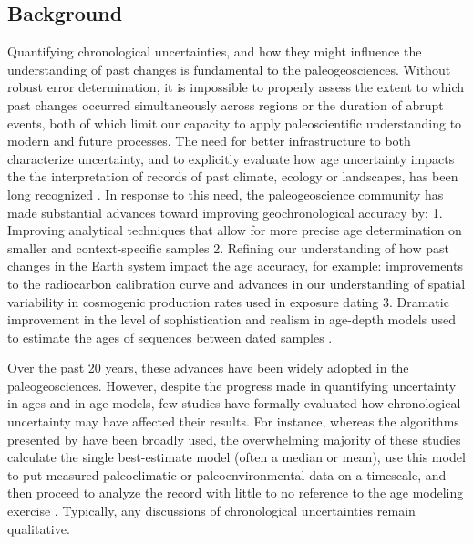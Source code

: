 \documentclass[gc, manuscript]{copernicus}
\begin{document}


\introduction

\subsection{Background}

Quantifying chronological uncertainties, and how they might influence
the understanding of past changes is fundamental to the
paleogeosciences. Without robust error determination, it is impossible
to properly assess the extent to which past changes occurred
simultaneously across regions or the duration of abrupt events, both of
which limit our capacity to apply paleoscientific understanding to
modern and future processes. The need for better infrastructure to both
characterize uncertainty, and to explicitly evaluate how age uncertainty
impacts the the interpretation of records of past climate, ecology or
landscapes, has been long recognized \citep[(more)]{Noren2013}. In
response to this need, the paleogeoscience community has made
substantial advances toward improving geochronological accuracy by: 1.
Improving analytical techniques that allow for more precise age
determination on smaller and context-specific samples
\citep[\citet{Eglinton96},\citet{Fifield2000},\citet{Eggins2005},\citet{Santos_blank_2010}]{Brown_radiocarbon89}
2. Refining our understanding of how past changes in the Earth system
impact the age accuracy, for example: improvements to the radiocarbon
calibration curve \citep[\citet{Stuiver98},intcal references]{Stuiver91}
and advances in our understanding of spatial variability in cosmogenic
production rates used in exposure dating \citep[Masarik2009]{Balco2009}
3. Dramatic improvement in the level of sophistication and realism in
age-depth models used to estimate the ages of sequences between dated
samples \citep[e.g.][\citet{parnell2008flexible},
\citet{Blaauw2010CLAM}, \citet{Blaauw2011BACON}]{Ramsey2009Bayesian}.

Over the past 20 years, these advances have been widely adopted in the
paleogeosciences. However, despite the progress made in quantifying
uncertainty in ages and in age models, few studies have formally
evaluated how chronological uncertainty may have affected their results.
For instance, whereas the algorithms presented by
\citep[\citet{parnell2008flexible}, \citet{Blaauw2010CLAM},
\citet{Blaauw2011BACON}]{Ramsey2009Bayesian} have been broadly used, the
overwhelming majority of these studies calculate the single
best-estimate model (often a median or mean), use this model to put
measured paleoclimatic or paleoenvironmental data on a timescale, and
then proceed to analyze the record with little to no reference to the
age modeling exercise
\citep[e.g.][and many others]{McKay2008,McKay2009}. Typically, any
discussions of chronological uncertainties remain qualitative.
\end{document}
